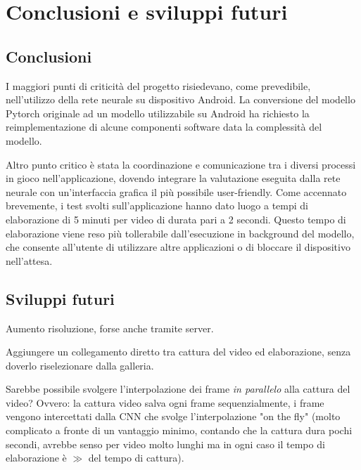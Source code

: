 \chapter{Conclusioni e sviluppi futuri}

\section{Conclusioni}

I maggiori punti di criticità del progetto risiedevano, come prevedibile, nell'utilizzo della rete neurale su dispositivo
Android. La conversione del modello Pytorch originale ad un modello utilizzabile su Android ha richiesto la reimplementazione
di alcune componenti software data la complessità del modello.

Altro punto critico è stata la coordinazione e comunicazione tra i diversi processi in gioco nell'applicazione, dovendo
integrare la valutazione eseguita dalla rete neurale con un'interfaccia grafica il più possibile user-friendly.
Come accennato brevemente, i test svolti sull'applicazione hanno dato luogo a tempi di elaborazione di 5 minuti per 
video di durata pari a 2 secondi. Questo tempo di elaborazione viene reso più tollerabile dall'esecuzione in background
del modello, che consente all'utente di utilizzare altre applicazioni o di bloccare il dispositivo nell'attesa.

\section{Sviluppi futuri}
\label{sec:sviluppi-futuri}

Aumento risoluzione, forse anche tramite server.

Aggiungere un collegamento diretto tra cattura del video ed elaborazione, senza doverlo riselezionare dalla galleria.

Sarebbe possibile svolgere l'interpolazione dei frame \emph{in parallelo} alla cattura del video?
Ovvero: la cattura video salva ogni frame sequenzialmente, i frame vengono intercettati dalla CNN che svolge 
l'interpolazione "on the fly" (molto complicato a fronte di un vantaggio minimo, contando che la cattura dura 
pochi secondi, avrebbe senso per video molto lunghi ma in ogni caso il tempo di elaborazione è $\gg$ del tempo di cattura).